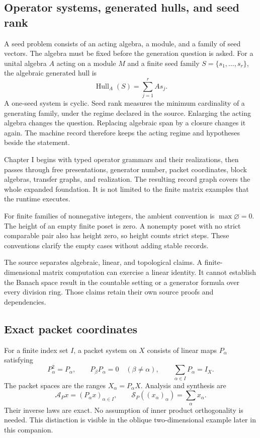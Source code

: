 \documentclass[a4paper,11pt]{article}
\newcommand{\Hull}{\operatorname{Hull}}\newcommand{\srank}{\operatorname{srank}}\newcommand{\psrank}{\operatorname{psrank}}\newcommand{\End}{\operatorname{End}}\newcommand{\Hom}{\operatorname{Hom}}\newcommand{\im}{\operatorname{im}}\newcommand{\Ker}{\operatorname{Ker}}\newcommand{\Jac}{\operatorname{Jac}}\newcommand{\Irr}{\operatorname{Irr}}\newcommand{\Span}{\operatorname{span}}\newcommand{\alg}{\operatorname{alg}}\newcommand{\Reach}{\operatorname{Reach}}\newcommand{\Supp}{\operatorname{Supp}}\newcommand{\id}{\mathrm{id}}\newcommand{\cl}[1]{\overline{#1}}
\begin{document}
\subsection{Operator systems, generated hulls, and seed rank}
A seed problem consists of an acting algebra, a module, and a family of seed vectors. The algebra must be fixed before the generation question is asked. For a unital algebra $A$ acting on a module $M$ and a finite seed family $S=\{s_1,\ldots,s_r\}$, the algebraic generated hull is
\[
\Hull_A(S)=\sum_{j=1}^{r}As_j.
\]
A one-seed system is cyclic. Seed rank measures the minimum cardinality of a generating family, under the regime declared in the source. Enlarging the acting algebra changes the question. Replacing algebraic span by a closure changes it again. The machine record therefore keeps the acting regime and hypotheses beside the statement.

Chapter I begins with typed operator grammars and their realizations, then passes through free presentations, generator number, packet coordinates, block algebras, transfer graphs, and realization. The resulting record graph covers the whole expanded foundation. It is not limited to the finite matrix examples that the runtime executes.

For finite families of nonnegative integers, the ambient convention is $\max\varnothing=0$. The height of an empty finite poset is zero. A nonempty poset with no strict comparable pair also has height zero, so height counts strict steps. These conventions clarify the empty cases without adding stable records.

The source separates algebraic, linear, and topological claims. A finite-dimensional matrix computation can exercise a linear identity. It cannot establish the Banach space result in the countable setting or a generator formula over every division ring. Those claims retain their own source proofs and dependencies.
\subsection{Exact packet coordinates}
For a finite index set $I$, a packet system on $X$ consists of linear maps $P_\alpha$ satisfying
\[
P_\alpha^2=P_\alpha,\qquad
P_\beta P_\alpha=0\quad(\beta\ne\alpha),\qquad
\sum_{\alpha\in I}P_\alpha=I_X.
\]
The packet spaces are the ranges $X_\alpha=P_\alpha X$. Analysis and synthesis are
\[
\mathcal A_Px=(P_\alpha x)_{\alpha\in I},\qquad
\mathcal S_P((x_\alpha)_\alpha)=\sum_\alpha x_\alpha.
\]
Their inverse laws are exact. No assumption of inner product orthogonality is needed. This distinction is visible in the oblique two-dimensional example later in this companion.
\end{document}
